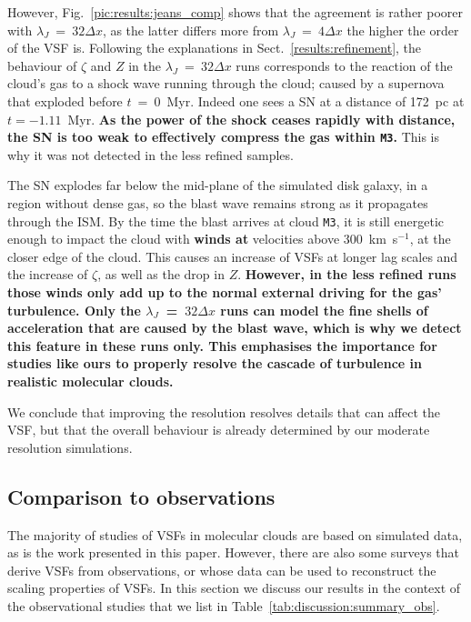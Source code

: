 However, Fig.~\ref{pic:results:jeans_comp} shows that the agreement is rather poorer with $\lambda_J$~=~$32\Delta{}x$, as the latter differs more from $\lambda_J$~=~$4\Delta{}x$ the higher the order of the VSF is.
Following the explanations in Sect.~\ref{results:refinement}, the behaviour of $\zeta$ and $Z$ in the $\lambda_J$~=~$32\Delta{}x$ runs corresponds to the reaction of the cloud's gas to a shock wave running through the cloud; caused by a supernova that exploded before $t$~=~0~Myr. 
Indeed one sees a SN at a distance of 172~pc at $t=-1.11$~Myr. 
\textbf{
	As the power of the shock ceases rapidly with distance, the SN is too weak to effectively compress the gas within \texttt{M3}.
}
This is why it was not detected in the less refined samples.

The SN explodes far below the mid-plane of the simulated disk galaxy, in a region without dense gas, so the blast wave remains strong as it propagates through the ISM. 
By the time the blast arrives at cloud \texttt{M3}, it is still energetic enough to impact the cloud with \textbf{winds at} velocities above 300~km~s$^{-1}$, at the closer edge of the cloud. 
This causes an increase of VSFs at longer lag scales and the increase of $\zeta$, as well as the drop in $Z$.
\textbf{
	However, in the less refined runs those winds only add up to the normal external driving for the gas' turbulence.
	Only the $\lambda_J$~=~$32\Delta{}x$ runs can model the fine shells of acceleration that are caused by the blast wave, which is why we detect this feature in these runs only. 
	This emphasises the importance for studies like ours to properly resolve the cascade of turbulence in realistic molecular clouds.
}

We conclude that improving the resolution resolves details that can affect the VSF, but that the overall behaviour is already determined by our moderate resolution simulations.

\subsection{Comparison to observations}\label{discussion:observation}

The majority of studies of VSFs in molecular clouds are based on simulated data, as is the work presented in this paper.
However, there are also some surveys that derive VSFs from observations, or whose data can be used to reconstruct the scaling properties of VSFs. 
In this section we discuss our results in the context of the observational studies that we list in Table~\ref{tab:discussion:summary_obs}.

